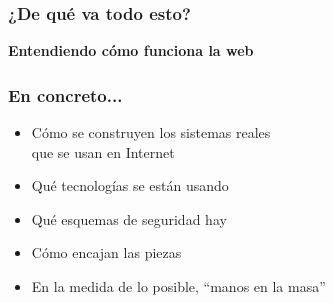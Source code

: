 
\begin{frame}
\frametitle{¿De qué va todo esto?}

\vspace{3.5cm}

\begin{center}
\color{white}
\Huge {\bf Entendiendo cómo funciona la web}
\end{center}

\end{frame}
\usebackgroundtemplate{}



\begin{frame}
\frametitle{En concreto...}

{\Large
\begin{itemize}
\item Cómo se construyen los sistemas reales \\
  que se usan en Internet
  \item Qué tecnologías se están usando
  \item Qué esquemas de seguridad hay
  \item Cómo encajan las piezas
  \item En la medida de lo posible, ``manos en la masa''
\end{itemize}
}

\end{frame}



